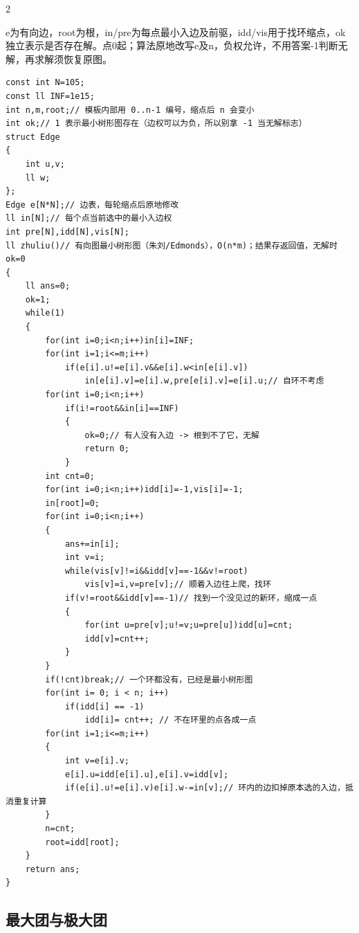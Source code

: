 \documentclass[UTF8,fontset=fandol,a4paper,twoside]{ctexart}
\newcommand{\note}[1]{{\fontsize{10}{12}\selectfont #1\par}}
\begin{document}
\begin{multicols}{2}
\note{e为有向边，root为根，in/\allowbreak{}pre为每点最小入边及前驱，idd/\allowbreak{}vis用于找环缩点，ok独立表示是否存在解。点0起；算法原地改写e及n，负权允许，不用答案-\allowbreak{}1判断无解，再求解须恢复原图。}
\begin{lstlisting}
const int N=105;
const ll INF=1e15;
int n,m,root;// 模板内部用 0..n-1 编号，缩点后 n 会变小
int ok;// 1 表示最小树形图存在（边权可以为负，所以别拿 -1 当无解标志）
struct Edge
{
    int u,v;
    ll w;
};
Edge e[N*N];// 边表，每轮缩点后原地修改
ll in[N];// 每个点当前选中的最小入边权
int pre[N],idd[N],vis[N];
ll zhuliu()// 有向图最小树形图（朱刘/Edmonds），O(n*m)；结果存返回值，无解时 ok=0
{
    ll ans=0;
    ok=1;
    while(1)
    {
        for(int i=0;i<n;i++)in[i]=INF;
        for(int i=1;i<=m;i++)
            if(e[i].u!=e[i].v&&e[i].w<in[e[i].v])
                in[e[i].v]=e[i].w,pre[e[i].v]=e[i].u;// 自环不考虑
        for(int i=0;i<n;i++)
            if(i!=root&&in[i]==INF)
            {
                ok=0;// 有人没有入边 -> 根到不了它，无解
                return 0;
            }
        int cnt=0;
        for(int i=0;i<n;i++)idd[i]=-1,vis[i]=-1;
        in[root]=0;
        for(int i=0;i<n;i++)
        {
            ans+=in[i];
            int v=i;
            while(vis[v]!=i&&idd[v]==-1&&v!=root)
                vis[v]=i,v=pre[v];// 顺着入边往上爬，找环
            if(v!=root&&idd[v]==-1)// 找到一个没见过的新环，缩成一点
            {
                for(int u=pre[v];u!=v;u=pre[u])idd[u]=cnt;
                idd[v]=cnt++;
            }
        }
        if(!cnt)break;// 一个环都没有，已经是最小树形图
        for(int i= 0; i < n; i++)
            if(idd[i] == -1)
                idd[i]= cnt++; // 不在环里的点各成一点
        for(int i=1;i<=m;i++)
        {
            int v=e[i].v;
            e[i].u=idd[e[i].u],e[i].v=idd[v];
            if(e[i].u!=e[i].v)e[i].w-=in[v];// 环内的边扣掉原本选的入边，抵消重复计算
        }
        n=cnt;
        root=idd[root];
    }
    return ans;
}
\end{lstlisting}
\subsection{最大团与极大团}


\end{multicols}
\end{document}
